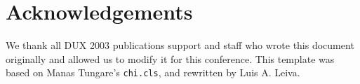 \documentclass{sigchi-ext}
\begin{document}
\section{Acknowledgements}
We thank all DUX 2003 publications support and staff who wrote this document originally and allowed us to modify it for this conference.
This template was based on Manas Tungare's \texttt{chi.cls}, and rewritten by Luis A. Leiva.

\balance


\end{document}
